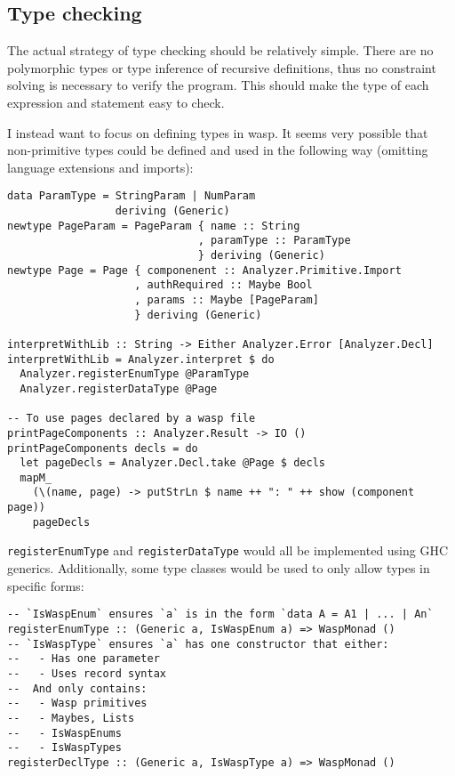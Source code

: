 \subsection{Type checking}

The actual strategy of type checking should be relatively simple. There are no
polymorphic types or type inference of recursive definitions, thus no constraint
solving is necessary to verify the program. This should make the type of each
expression and statement easy to check.

I instead want to focus on defining types in wasp. It seems very possible that
non-primitive types could be defined and used in the following way (omitting
language extensions and imports):

\begin{minipage}{\linewidth}
\begin{lstlisting}
data ParamType = StringParam | NumParam
                 deriving (Generic)
newtype PageParam = PageParam { name :: String
                              , paramType :: ParamType
                              } deriving (Generic)
newtype Page = Page { componenent :: Analyzer.Primitive.Import
                    , authRequired :: Maybe Bool
                    , params :: Maybe [PageParam]
                    } deriving (Generic)

interpretWithLib :: String -> Either Analyzer.Error [Analyzer.Decl]
interpretWithLib = Analyzer.interpret $ do
  Analyzer.registerEnumType @ParamType
  Analyzer.registerDataType @Page

-- To use pages declared by a wasp file
printPageComponents :: Analyzer.Result -> IO ()
printPageComponents decls = do
  let pageDecls = Analyzer.Decl.take @Page $ decls
  mapM_
    (\(name, page) -> putStrLn $ name ++ ": " ++ show (component page))
    pageDecls
\end{lstlisting}
\end{minipage}

\texttt{registerEnumType} and \texttt{registerDataType} would all be
implemented using GHC generics. Additionally, some type classes would be used
to only allow types in specific forms:

\begin{minipage}{\linewidth}
\begin{lstlisting}
-- `IsWaspEnum` ensures `a` is in the form `data A = A1 | ... | An`
registerEnumType :: (Generic a, IsWaspEnum a) => WaspMonad ()
-- `IsWaspType` ensures `a` has one constructor that either:
--   - Has one parameter
--   - Uses record syntax
--  And only contains:
--   - Wasp primitives
--   - Maybes, Lists
--   - IsWaspEnums
--   - IsWaspTypes
registerDeclType :: (Generic a, IsWaspType a) => WaspMonad ()
\end{lstlisting}
\end{minipage}

